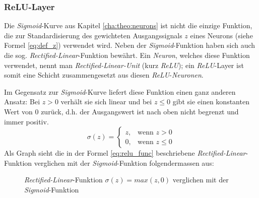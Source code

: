 \subsubsection{ReLU-Layer}\label{cha:theo:relu}
Die \textit{Sigmoid}-Kurve aus Kapitel \ref{cha:theo:neurons} ist nicht die einzige Funktion, die zur Standardisierung des gewichteten Ausgangssignals $z$ eines Neurons (siehe Formel \ref{eq:def_z}) verwendet wird. Neben der \textit{Sigmoid}-Funktion haben sich auch die sog. \textit{Rectified-Linear}-Funktion bewährt. Ein \textit{Neuron}, welches diese Funktion verwendet, nennt man \textit{Rectified-Linear-Unit} (kurz \textit{ReLU}); ein \textit{ReLU}-Layer ist somit eine Schicht zusammengesetzt aus diesen \textit{ReLU}-\textit{Neuronen}.

Im Gegensatz zur \textit{Sigmoid}-Kurve liefert diese Funktion einen ganz anderen Ansatz: Bei $z > 0$ verhält sie sich linear und bei $z \leq 0$ gibt sie einen konstanten Wert von 0 zurück, d.h. der Ausgangswert ist nach oben nicht begrenzt und immer positiv.
\begin{equation}\label{eq:relu_func}
	\sigma(z) = \begin{cases} z, & \mbox{wenn } z > 0 \\ 0, & \mbox{wenn } z \leq 0 \end{cases}
\end{equation}
Als Graph sieht die in der Formel \ref{eq:relu_func} beschriebene \textit{Rectified-Linear}-Funktion verglichen mit der \textit{Sigmoid}-Funktion folgendermassen aus:

\begin{figure}[h]
	\centering
	\caption[\textit{Rectified-Linear}-Funktion]{\textit{Rectified-Linear}-Funktion $\sigma(z) = max(z,0)$ verglichen mit der \textit{Sigmoid}-Funktion}
	\label{plt:rect_lin}
\end{figure}

